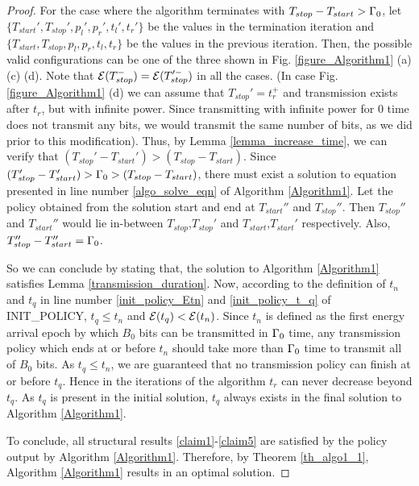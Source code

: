 \begin{proof}
For the case where the algorithm terminates with $T_{stop}-T_{start}>\Gamma_0$, let $\{T_{start}',T_{stop}',p_l',p_r',t_l',t_r'\}$ be the values in the termination iteration and $\{T_{start},T_{stop},p_l,p_r,t_l,t_r\}$ be the values in the previous iteration. Then, the possible valid configurations can be one of the three shown in Fig. \ref{figure_Algorithm1} (a) (c) (d). Note that $\mathcal{E}(T_{stop}^-)=\mathcal{E}(T_{stop}'^-)$ in all the cases. (In case Fig. \ref{figure_Algorithm1} (d) we can assume that $T_{stop}'=t_r^+$ and transmission exists after $t_r$, but with infinite power. Since transmitting with infinite power for $0$ time does not transmit any bits, we would transmit the same number of bits, as we did prior to this modification). Thus, by Lemma \ref{lemma_increase_time}, we can verify that $(T_{stop}'-T_{start}')>(T_{stop}-T_{start})$. Since $(T_{stop}'-T_{start}')>\Gamma_0>(T_{stop}-T_{start})$, there must exist a solution to equation presented in line number \ref{algo_solve_eqn} of Algorithm \ref{Algorithm1}. Let the policy obtained from the solution start and end at $T_{start}''$ and $T_{stop}''$. Then $T_{stop}''$ and $T_{start}''$ would lie in-between $T_{stop}$,$T_{stop}'$ and $T_{start}$,$T_{start}'$ respectively. Also, $T_{stop}''-T_{start}''=\Gamma_0$.

So we can conclude by stating that, the solution to Algorithm \ref{Algorithm1} satisfies Lemma \ref{transmission_duration}. Now, according to the definition of $t_n$ and $t_q$ in line number \ref{init_policy_Etn} and \ref{init_policy_t_q} of INIT\_POLICY, $t_q\le t_n$ and $\mathcal{E}(t_q)<\mathcal{E}(t_n)$. Since $t_n$ is defined as the first energy arrival epoch by which $B_0$ bits can be transmitted in $\Gamma_0$ time, any transmission policy which ends at or before $t_n$ should take more than $\Gamma_0$ time to transmit all of $B_0$ bits. As $t_q\le t_n$, we are guaranteed that no transmission policy can finish at or before $t_q$. Hence in the iterations of the algorithm $t_r$ can never decrease beyond $t_q$. As $t_q$ is present in the initial solution, $t_q$ always exists in the final solution to Algorithm \ref{Algorithm1}.  
 
To conclude, all structural results \eqref{claim1}-\eqref{claim5} are satisfied by the policy output by Algorithm \ref{Algorithm1}. Therefore,  by Theorem \ref{th_algo1_1}, Algorithm \ref{Algorithm1} results in an optimal solution.
\end{proof}